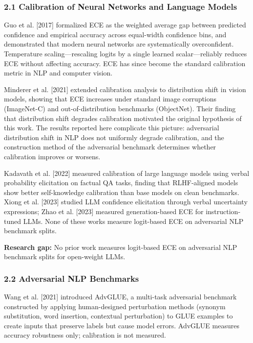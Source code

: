 
\subsubsection{2.1 Calibration of Neural Networks and Language Models}

Guo et al. [2017] formalized ECE as the weighted average gap between predicted confidence and empirical accuracy across equal-width confidence bins, and demonstrated that modern neural networks are systematically overconfident. Temperature scaling---rescaling logits by a single learned scalar---reliably reduces ECE without affecting accuracy. ECE has since become the standard calibration metric in NLP and computer vision.

Minderer et al. [2021] extended calibration analysis to distribution shift in vision models, showing that ECE increases under standard image corruptions (ImageNet-C) and out-of-distribution benchmarks (ObjectNet). Their finding that distribution shift degrades calibration motivated the original hypothesis of this work. The results reported here complicate this picture: adversarial distribution shift in NLP does not uniformly degrade calibration, and the construction method of the adversarial benchmark determines whether calibration improves or worsens.

Kadavath et al. [2022] measured calibration of large language models using verbal probability elicitation on factual QA tasks, finding that RLHF-aligned models show better self-knowledge calibration than base models on clean benchmarks. Xiong et al. [2023] studied LLM confidence elicitation through verbal uncertainty expressions; Zhao et al. [2023] measured generation-based ECE for instruction-tuned LLMs. None of these works measure logit-based ECE on adversarial NLP benchmark splits.

\textbf{Research gap:} No prior work measures logit-based ECE on adversarial NLP benchmark splits for open-weight LLMs.

\subsubsection{2.2 Adversarial NLP Benchmarks}

Wang et al. [2021] introduced AdvGLUE, a multi-task adversarial benchmark constructed by applying human-designed perturbation methods (synonym substitution, word insertion, contextual perturbation) to GLUE examples to create inputs that preserve labels but cause model errors. AdvGLUE measures accuracy robustness only; calibration is not measured.

